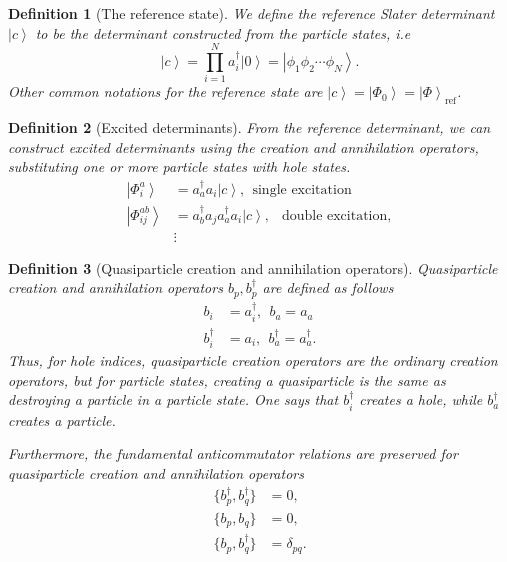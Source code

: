 \documentclass[a4paper,10pt]{article}
\newcommand{\ket}[1]{\left| #1 \right\rangle} \newcommand{\element}[3]
\theoremstyle{definition}
\newtheorem{definition}{Definition}
\begin{document}
\begin{definition}[The reference state]
 We define the reference Slater determinant $\ket{c}$ to be the determinant constructed from the particle states, i.e 
 \begin{equation}
  \ket{c} = \prod_{i=1}^N a_i^\dagger \ket{0} = \ket{\phi_1 \phi_2 \cdots \phi_N}.
 \end{equation}
Other common notations for the reference state are $\ket{c} = \ket{\Phi_0} = \ket{\Phi}_\text{ref}$.
\end{definition}

\begin{definition}[Excited determinants]
 From the reference determinant, we can construct excited determinants using the creation and annihilation operators,
 substituting one or more particle states with hole states.
 \begin{align*}
  \ket{\Phi_i^a} &= a_a^\dagger a_i \ket{c}, \ \ \text{single excitation} \\
  \ket{\Phi_{ij}^{ab}} &= a_b^\dagger a_j a_a^\dagger a_i \ket{c}, \ \ \text{ double excitation}, \\
  &\vdots
 \end{align*}
\end{definition}

\begin{definition}[Quasiparticle creation and annihilation operators]
 Quasiparticle creation and annihilation operators $b_p,b_p^\dagger$ are defined as follows
 \begin{align}
  b_i &= a_i^\dagger, \ \ b_a = a_a \\
  b_i^\dagger &= a_i, \ \ b_a^\dagger = a_a^\dagger.
 \end{align}
 Thus, for hole indices, quasiparticle creation operators are the ordinary creation operators, but for
particle states, creating a quasiparticle is the same as destroying a particle in a particle state. One says
that $b_i^\dagger$ creates a hole, while $b_a^\dagger$ creates a particle.

Furthermore, the fundamental anticommutator relations are preserved for quasiparticle creation and annihilation operators
\begin{align}
 \{b_p^\dagger,b_q^\dagger \} &= 0, \\
 \{b_p,b_q \} &= 0, \\
 \{b_p,b_q^\dagger \} &= \delta_{pq}.
\end{align}
\end{definition}
\end{document}
